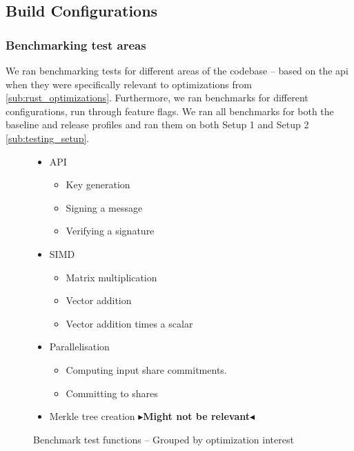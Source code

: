 \documentclass[11pt]{report}
\theoremstyle{definition}
\theoremstyle{plain}
\newcommand{\todo}[1]{{\color[rgb]{.5,0,0}\textbf{$\blacktriangleright$#1$\blacktriangleleft$}}}
\begin{document}
\subsection{Build Configurations}\label{sub:build_config}


\subsubsection{Benchmarking test areas}\label{sub:bench_test_areas}

We ran benchmarking tests for different areas of the codebase -- based on the api when they were specifically relevant to optimizations from \autoref{sub:rust_optimizations}. Furthermore, we ran benchmarks for different configurations, run through feature flags. We ran all benchmarks for both the baseline and release profiles and ran them on both Setup 1 and Setup 2 \autoref{sub:testing_setup}.

\begin{figure}
  \begin{itemize}
    \item API
          \begin{itemize}
            \item Key generation
            \item Signing a message 
            \item Verifying a signature
          \end{itemize}
    \item SIMD
          \begin{itemize}
            \item Matrix multiplication
            \item Vector addition
            \item Vector addition times a scalar
          \end{itemize}
    \item Parallelisation
          \begin{itemize}
            \item Computing input share commitments.
            \item Committing to shares
          \end{itemize}
    \item Merkle tree creation \todo{Might not be relevant}
  \end{itemize}
  \caption{Benchmark test functions -- Grouped by optimization interest}\label{fig:bench_test_functions}
\end{figure}
\end{document}
